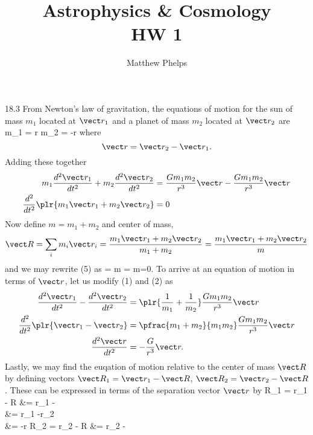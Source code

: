 \documentclass[10pt,letterpaper]{article}
\title{Astrophysics \& Cosmology\\HW 1}
\author{Matthew Phelps}
\date{}
\begin{document}
\maketitle

\benum

\item[18.3]
From Newton's law of gravitation, the equations of motion for the sun of mass $m_1$ located at $\vect r_1$ and a planet of mass $m_2$ located at $\vect r_2$ are
\be
	m_1  = \vect r
\ee
\be
	 m_2 = -\vect r
\ee
where
\[
	\vect r= \vect r_2-\vect r_1.
\]
Adding these together
\begin{align}
	m_1 \frac{d^2 \vect r_1}{dt^2} + m_2\frac{d^2 \vect r_2}{dt^2} &=  \frac{Gm_1m_2}{r^3}\vect r- \frac{Gm_1m_2}{r^3}\vect r\\
	\frac{d^2}{dt^2}\plr{ m_1 \vect r_1 + m_2 \vect r_2} &= 0\label{1}
\end{align}
Now define $m = m_1+m_2$ and center of mass,
\[
	\vect R = \sum_i m_i \vect r_i = \frac{m_1 \vect r_1 + m_2 \vect r_2}{m_1+m_2} = \frac{m_1\vect r_1 + m_2\vect r_2}{m}
\]
and we may rewrite (5) as
\be
	 = m  = m=0.
\ee
To arrive at an equation of motion in terms of $\vect r$, let us modify (1) and (2) as
\begin{align}
	\frac{d^2 \vect r_1}{dt^2} - \frac{d^2 \vect r_2}{dt^2} &= \plr{\frac1{m_1} + \frac1{m_2}}\frac{Gm_1m_2}{r^3}\vect r\\
	\frac{d^2}{dt^2}\plr{ \vect r_1-\vect r_2} &= \pfrac{m_1+m_2}{m_1m_2} \frac{Gm_1m_2}{r^3}\vect r \\
	\frac{d^2\vect r}{dt^2} &= -\frac{G}{r^3}\vect r.
\end{align}
Lastly, we may find the euqation of motion relative to the center of mass $\vect R$ by defining vectors $\vect R_1 = \vect r_1 - \vect R$, $\vect R_2 = \vect r_2 -\vect R$. These can be expressed in terms of the separation vector $\vect r$ by
\ba
	\vect R_1 = \vect r_1 - \vect R &= \vect r_1 -  \\
	&= \vect r_1  -\vect r_2 \\
	&= -\vect r
\ea
\ba
	\vect R_2 = \vect r_2 - \vect R &= \vect r_2 -  \\
\end{document}
